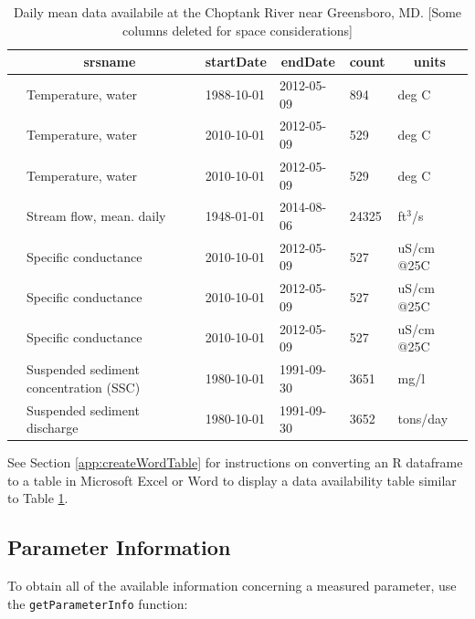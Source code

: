 \documentclass[a4paper,11pt]{article}\usepackage[]{graphicx}\usepackage[]{color}
\begin{document}
\begin{table}[ht]
\caption{Daily mean data availabile at the Choptank River near Greensboro, MD. [Some columns deleted for space considerations]} 
\label{tab:gda}
{\footnotesize
\begin{tabular}{rlllll}
  \hline
 & \multicolumn{1}{c}{\textbf{\textsf{srsname}}} & \multicolumn{1}{c}{\textbf{\textsf{startDate}}} & \multicolumn{1}{c}{\textbf{\textsf{endDate}}} & \multicolumn{1}{c}{\textbf{\textsf{count}}} & \multicolumn{1}{c}{\textbf{\textsf{units}}} \\ 
  \hline
 & Temperature, water & 1988-10-01 & 2012-05-09 & 894 & deg C \\ 
  [5pt] & Temperature, water & 2010-10-01 & 2012-05-09 & 529 & deg C \\ 
  [5pt] & Temperature, water & 2010-10-01 & 2012-05-09 & 529 & deg C \\ 
  [5pt] & Stream flow, mean. daily & 1948-01-01 & 2014-08-06 & 24325 & ft$^3$/s \\ 
  [5pt] & Specific conductance & 2010-10-01 & 2012-05-09 & 527 & uS/cm @25C \\ 
  [5pt] & Specific conductance & 2010-10-01 & 2012-05-09 & 527 & uS/cm @25C \\ 
  [5pt] & Specific conductance & 2010-10-01 & 2012-05-09 & 527 & uS/cm @25C \\ 
  [5pt] & Suspended sediment concentration (SSC) & 1980-10-01 & 1991-09-30 & 3651 & mg/l \\ 
  [5pt] & Suspended sediment discharge & 1980-10-01 & 1991-09-30 & 3652 & tons/day \\ 
   \hline
\end{tabular}
}
\end{table}


See Section \ref{app:createWordTable} for instructions on converting an R dataframe to a table in Microsoft Excel or Word to display a data availability table similar to Table \ref{tab:gda}.

\FloatBarrier

\subsection{Parameter Information}
\label{sec:usgsParams}
To obtain all of the available information concerning a measured parameter, use the \texttt{getParameterInfo} function:
\end{document}
